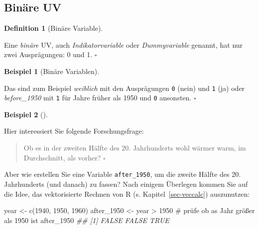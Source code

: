 \documentclass[
  letterpaper,
  oneside,
  open=any]{scrbook}
\newenvironment{Shaded}{\begin{snugshade}}{\end{snugshade}}
\newcommand{\CommentTok}[1]{\textcolor[rgb]{0.37,0.37,0.37}{#1}}
\newcommand{\DecValTok}[1]{\textcolor[rgb]{0.68,0.00,0.00}{#1}}
\newcommand{\DocumentationTok}[1]{\textcolor[rgb]{0.37,0.37,0.37}{\textit{#1}}}
\newcommand{\FunctionTok}[1]{\textcolor[rgb]{0.28,0.35,0.67}{#1}}
\newcommand{\NormalTok}[1]{\textcolor[rgb]{0.00,0.23,0.31}{#1}}
\newcommand{\OtherTok}[1]{\textcolor[rgb]{0.00,0.23,0.31}{#1}}
\newcommand{\SpecialCharTok}[1]{\textcolor[rgb]{0.37,0.37,0.37}{#1}}
\theoremstyle{definition}
\theoremstyle{definition}
\newtheorem{example}{Beispiel}[chapter]
\theoremstyle{definition}
\newtheorem{definition}{Definition}[chapter]
\theoremstyle{remark}
\begin{document}
\subsection{Binäre UV}\label{binuxe4re-uv}

\begin{definition}[Binäre
Variable]\protect\hypertarget{def-binvar}{}\label{def-binvar}

Eine \emph{binäre} UV, auch \emph{Indikatorvariable} oder
\emph{Dummyvariable} genannt, hat nur zwei Ausprägungen: 0 und 1.
\(\square\)

\end{definition}

\begin{example}[Binäre
Variablen]\protect\hypertarget{exm-bin}{}\label{exm-bin}

Das sind zum Beispiel \emph{weiblich} mit den Ausprägungen \texttt{0}
(nein) und \texttt{1} (ja) oder \emph{before\_1950} mit \texttt{1} für
Jahre früher als 1950 und \texttt{0} ansonsten. \(\square\)

\end{example}

\begin{example}[]\protect\hypertarget{exm-binuv}{}\label{exm-binuv}

Hier interessiert Sie folgende Forschungsfrage:

\begin{quote}
{} Ob es in der zweiten Hälfte des 20. Jahrhunderts wohl
wärmer warm, im Durchschnitt, als vorher? \(\square\)
\end{quote}

\end{example}

Aber wie erstellen Sie eine Variable \texttt{after\_1950}, um die zweite
Hälfte des 20. Jahrhunderts (und danach) zu fassen? Nach einigem
Überlegen kommen Sie auf die Idee, das vektorisierte Rechnen von R (s.
Kapitel~\ref{sec-veccalc}) auszunutzen:

\begin{Shaded}
\begin{Highlighting}[]
\NormalTok{year }\OtherTok{\textless{}{-}} \FunctionTok{c}\NormalTok{(}\DecValTok{1940}\NormalTok{, }\DecValTok{1950}\NormalTok{, }\DecValTok{1960}\NormalTok{)}
\NormalTok{after\_1950 }\OtherTok{\textless{}{-}}\NormalTok{ year }\SpecialCharTok{\textgreater{}} \DecValTok{1950}  \CommentTok{\# prüfe ob as Jahr größer als 1950 ist}
\NormalTok{after\_1950}
\DocumentationTok{\#\# [1] FALSE FALSE  TRUE}
\end{Highlighting}
\end{Shaded}
\end{document}
